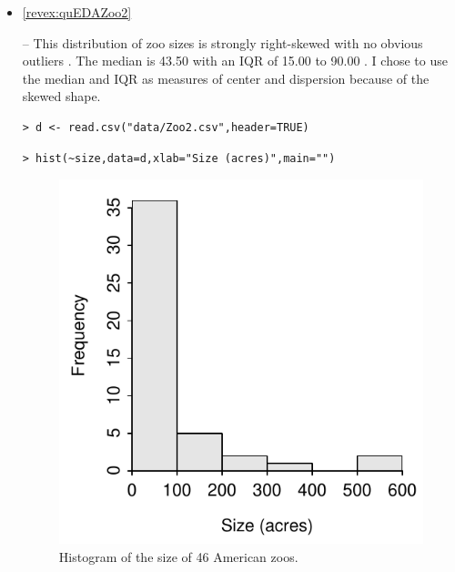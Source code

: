 \documentclass[10pt,openany]{book}\usepackage[]{graphicx}\usepackage[]{color}
\makeatletter
\newenvironment{kframe}{%
 \def\at@end@of@kframe{}%
 \ifinner\ifhmode%
  \def\at@end@of@kframe{\end{minipage}}%
  \begin{minipage}{\columnwidth}%
 \fi\fi%
 \def\FrameCommand##1{\hskip\@totalleftmargin \hskip-\fboxsep
 \colorbox{shadecolor}{##1}\hskip-\fboxsep
     \hskip-\linewidth \hskip-\@totalleftmargin \hskip\columnwidth}%
 \MakeFramed {\advance\hsize-\width
   \@totalleftmargin\z@ \linewidth\hsize
   \@setminipage}}%
 {\par\unskip\endMakeFramed%
 \at@end@of@kframe}
\newenvironment{knitrout}{}{} %
\makeatother
\begin{document}
\begin{itemize}
  \item \hypertarget{ans:quEDAZoo2}{\ref{revex:quEDAZoo2}} -- This distribution of zoo sizes is strongly right-skewed with no obvious outliers .  The median is 43.50 with an IQR of 15.00 to 90.00 .  I chose to use the median and IQR as measures of center and dispersion because of the skewed shape.
\begin{knitrout}
\color{fgcolor}\begin{kframe}
\begin{verbatim}
> d <- read.csv("data/Zoo2.csv",header=TRUE)
\end{verbatim}
\end{kframe}
\end{knitrout}
\begin{knitrout}
\color{fgcolor}\begin{kframe}
\begin{verbatim}
> hist(~size,data=d,xlab="Size (acres)",main="")
\end{verbatim}
\end{kframe}\begin{figure}[hbtp]

{\centering \includegraphics[width=.4\linewidth]{Figs/ZooHist-1} 

}

\caption[Histogram of the size of 46 American zoos]{Histogram of the size of 46 American zoos.}\label{fig:ZooHist}
\end{figure}



\end{knitrout}
\end{itemize}
\end{document}
